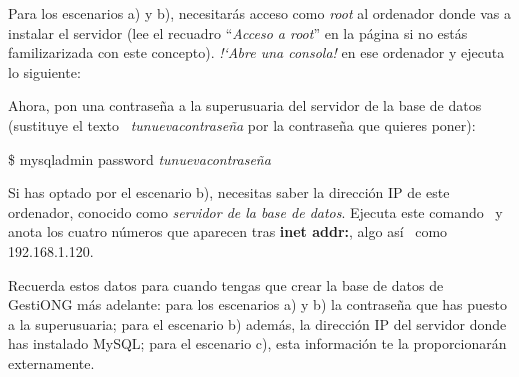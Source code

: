 \bigskip

Para los escenarios a) y b), necesitarás acceso como \textit{root} al
ordenador donde vas a instalar el servidor (lee el recuadro
{\textquotedblleft}\textit{Acceso a root}{\textquotedblright} en la
página \pageref{ref:accesoroot} si no estás familizarizada con este
concepto). \textit{!`Abre una consola!} en ese ordenador y ejecuta lo
siguiente:



\begin{center}
\begin{minipage}{16.48cm}
{\itshape
{}}


{\itshape
{}}

{\itshape
{}}

{\itshape
{}}
\end{minipage}
\end{center}

\bigskip


\bigskip

Ahora, pon una contraseña a la superusuaria del servidor de la base de
datos (sustituye el texto \ \textit{tunuevacontraseña} por la
contraseña que quieres poner):



\begin{center}
\begin{minipage}{16.48cm}
\$ mysqladmin password \textit{tunuevacontraseña}
\end{minipage}
\end{center}

\bigskip


\bigskip

Si has optado por el escenario b), necesitas saber la dirección IP de
este ordenador, conocido como \textit{servidor de la base de datos}.
Ejecuta este comando \ y anota los cuatro números que aparecen tras
\textbf{inet addr:}, algo así \ como 192.168.1.120.



\begin{center}
\begin{minipage}{16.48cm}


\end{minipage}
\end{center}

\bigskip


\bigskip

Recuerda estos datos para cuando tengas que crear la base de datos de
GestiONG más adelante: para los escenarios a) y b) la contraseña
que has puesto a la superusuaria; para el escenario b) además, la
dirección IP del servidor donde has instalado MySQL; para el
escenario c), esta información te la proporcionarán externamente. 
